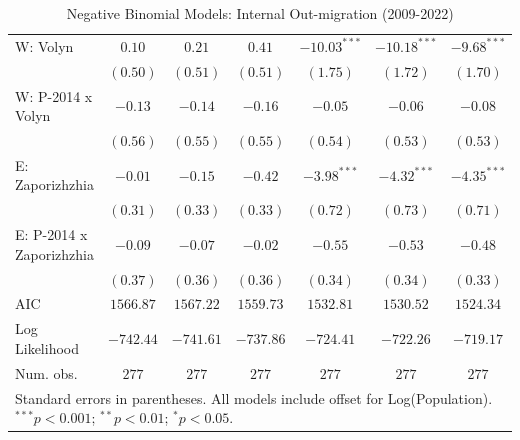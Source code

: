 \begin{table}
\begin{center}
\begin{small}
\begin{tabular}{l c c c c c c}
W: Volyn                    & $0.10$        & $0.21$      & $0.41$         & $-10.03^{***}$ & $-10.18^{***}$ & $-9.68^{***}$  \\
                            & $(0.50)$      & $(0.51)$    & $(0.51)$       & $(1.75)$       & $(1.72)$       & $(1.70)$       \\
W: P-2014 x Volyn           & $-0.13$       & $-0.14$     & $-0.16$        & $-0.05$        & $-0.06$        & $-0.08$        \\
                            & $(0.56)$      & $(0.55)$    & $(0.55)$       & $(0.54)$       & $(0.53)$       & $(0.53)$       \\
E: Zaporizhzhia             & $-0.01$       & $-0.15$     & $-0.42$        & $-3.98^{***}$  & $-4.32^{***}$  & $-4.35^{***}$  \\
                            & $(0.31)$      & $(0.33)$    & $(0.33)$       & $(0.72)$       & $(0.73)$       & $(0.71)$       \\
E: P-2014 x Zaporizhzhia    & $-0.09$       & $-0.07$     & $-0.02$        & $-0.55$        & $-0.53$        & $-0.48$        \\
                            & $(0.37)$      & $(0.36)$    & $(0.36)$       & $(0.34)$       & $(0.34)$       & $(0.33)$       \\
\hline
AIC                         & $1566.87$     & $1567.22$   & $1559.73$      & $1532.81$      & $1530.52$      & $1524.34$      \\
Log Likelihood              & $-742.44$     & $-741.61$   & $-737.86$      & $-724.41$      & $-722.26$      & $-719.17$      \\
Num. obs.                   & $277$         & $277$       & $277$          & $277$          & $277$          & $277$          \\
\hline
\multicolumn{7}{l}{\tiny{Standard errors in parentheses. All models include offset for Log(Population). $^{***}p<0.001$; $^{**}p<0.01$; $^{*}p<0.05$.}}
\end{tabular}
\end{small}
\caption{Negative Binomial Models: Internal Out-migration (2009-2022)}
\label{tab:out_migration}
\end{center}
\end{table}
